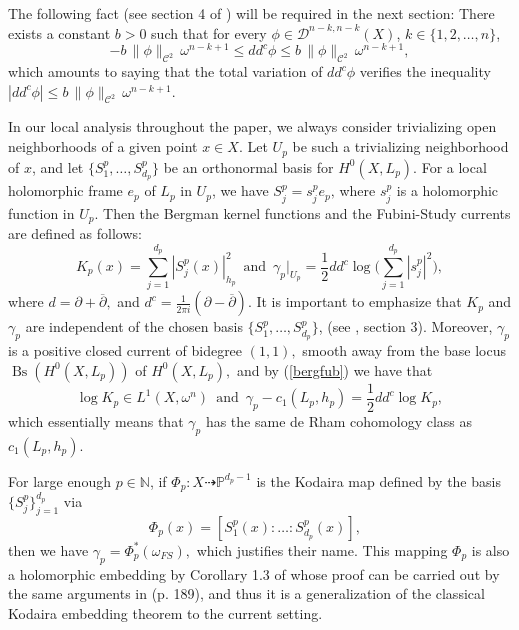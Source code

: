 \documentclass[11pt,leqno,oneside]{amsart}
\numberwithin{equation}{section}
\begin{document}
The following fact (see section 4 of \cite{BCM}) will be required in the next section: There exists a constant $b>0$ such that for every  $\phi\in \mathcal{D}^{n-k, n-k}(X)$, $k \in \{1, 2, \ldots, n\}$, \begin{equation}\label{hercomp}
                              -b\, \| \phi \|_{\mathscr{C}^{2}}\, \omega^{n-k+1}\leq dd^{c}\phi \leq b \, \| \phi \|_{\mathscr{C}^{2}} \,  \omega^{n-k+1},
                            \end{equation}which amounts to saying that the total variation of $dd^{c}\phi$ verifies the inequality $|dd^{c}\phi|\leq b \, \| \phi \|_{\mathscr{C}^{2}} \, \omega^{n-k+1}$.

 In our local analysis throughout the paper, we always consider trivializing open neighborhoods of a given point $x\in X$. Let $U_{p}$ be such a trivializing neighborhood of $x$, and let $\{S_{1}^{p}, \ldots, S^{p}_{d_{p}}\}$ be an orthonormal basis for $H^{0}(X, L_{p})$. For a local holomorphic frame  $e_{p}$ of $L_{p}$ in $U_{p}$, we have $S^{p}_{j}=s^{p}_{j}e_{p},$\,where $s^{p}_{j}$ is a holomorphic function in $U_{p}.$ Then the Bergman kernel functions and the Fubini-Study currents are defined as follows:
\begin{equation}\label{bergfub}
  K_{p}(x)=\sum^{d_{p}}_{j=1}{|S^{p}_{j}(x)|^{2}_{h_{p}}}\,\,\,\text{and}\,\,\,\gamma_{p}|_{U_{p}}=\frac{1}{2}dd^{c}\log\big(\sum^{d_{p}}_{j=1}{|s^{p}_{j}|^{2}}\big),
\end{equation}
where $d=\partial+\overline{\partial},$ and $d^{c}=\frac{1}{2\pi i}(\partial- \overline{\partial})$.  It is important to emphasize that $K_{p}$ and $\gamma_{p}$ are independent of the chosen basis $\{{S_{1}^{p}, \ldots, S^{p}_{d_{p}}}\}$, (see \cite{CM1}, section 3). Moreover, $\gamma_{p}$ is a positive closed current of bidegree $(1, 1),$ smooth away from the base locus $\operatorname{Bs}(H^{0}(X,L_{p}))$ of $H^{0}(X,L_{p}),$ and by (\ref{bergfub}) we have that \begin{equation}\label{fubstu} \log{K_{p}}\in L^{1}(X,  \omega^{n})\,\,\, \text{and}\,\,\,\gamma_{p}- c_{1}(L_{p}, h_{p})=\frac{1}{2}dd^{c}\log{K_{p}},\end{equation}
which essentially means that $\gamma_{p}$  has the same de Rham cohomology class as $c_{1}(L_{p},h_{p})$.

 For large enough $p\in \mathbb{N}$, if $\Phi_{p}: X\dashrightarrow\mathbb{P}^{d_{p}-1}$ is the Kodaira map defined by the basis $\{S_{j}^{p}\}_{j=1}^{d_{p}}$ via $$\Phi_{p}(x)=[S_{1}^{p}(x):\ldots:S_{d_{p}}^{p}(x)],\,\,\,\,$$ then we have $\gamma_{p}=\Phi_{p}^{*}(\omega_{FS}),$ which justifies their name. This mapping $\Phi_{p}$ is also a holomorphic embedding by Corollary 1.3 of \cite{CLMM} whose proof can be carried out by the same arguments in \cite{GH} (p. 189), and thus it is a generalization of the classical Kodaira embedding theorem to the current setting.
\end{document}
